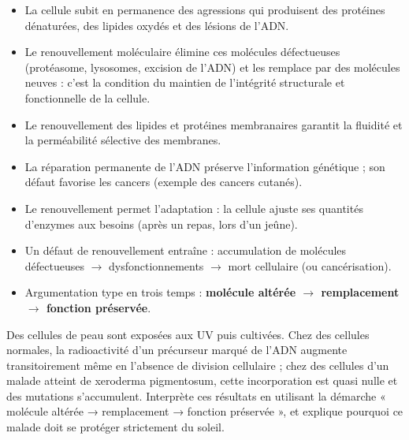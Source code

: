 \documentclass[11pt]{article}
\newcommand{\cle}[1]{{\popxbold\color{popdark}#1}}
\begin{document}
\begin{aretenir}
\begin{itemize}
\item La cellule subit en permanence des agressions qui produisent des \cle{protéines dénaturées}, des \cle{lipides oxydés} et des \cle{lésions de l'ADN}.
\item Le \cle{renouvellement moléculaire} élimine ces molécules défectueuses (protéasome, lysosomes, excision de l'ADN) et les remplace par des molécules neuves : c'est la condition du maintien de l'\cle{intégrité structurale et fonctionnelle} de la cellule.
\item Le renouvellement des lipides et protéines membranaires garantit la \cle{fluidité} et la \cle{perméabilité sélective} des membranes.
\item La réparation permanente de l'ADN préserve l'\cle{information génétique} ; son défaut favorise les cancers (exemple des cancers cutanés).
\item Le renouvellement permet l'\cle{adaptation} : la cellule ajuste ses quantités d'enzymes aux besoins (après un repas, lors d'un jeûne).
\item Un défaut de renouvellement entraîne : accumulation de molécules défectueuses $\rightarrow$ dysfonctionnements $\rightarrow$ mort cellulaire (ou cancérisation).
\item Argumentation type en trois temps : \textbf{molécule altérée $\rightarrow$ remplacement $\rightarrow$ fonction préservée}.
\end{itemize}
\end{aretenir}

\begin{exercice}
Des cellules de peau sont exposées aux UV puis cultivées. Chez des cellules normales, la radioactivité d'un précurseur marqué de l'ADN augmente transitoirement même en l'absence de division cellulaire ; chez des cellules d'un malade atteint de xeroderma pigmentosum, cette incorporation est quasi nulle et des mutations s'accumulent. Interprète ces résultats en utilisant la démarche « molécule altérée → remplacement → fonction préservée », et explique pourquoi ce malade doit se protéger strictement du soleil.
\end{exercice}
\end{document}
